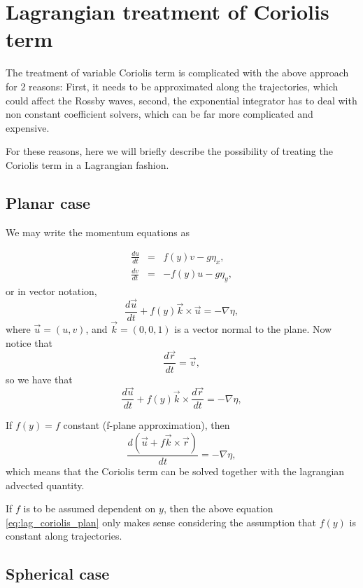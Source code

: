 \documentclass[10pt,a4paper]{article}
\begin{document}
\section{Lagrangian treatment of Coriolis term}

The treatment of variable Coriolis term is complicated with the above approach for 2 reasons: First, it needs to be approximated along the trajectories, which could affect the Rossby waves, second, the exponential integrator has to deal with non constant coefficient solvers, which can be far more complicated and expensive.

For these reasons, here we will briefly describe the possibility of treating the Coriolis term in a Lagrangian fashion.

\subsection{Planar case}
We may write the momentum equations as

\begin{eqnarray}
\frac{du}{dt}&=&  f(y)v -g\eta_x,\\
\frac{dv}{dt} &=& -f(y)u- g\eta_y, 
\end{eqnarray}
or in vector notation,
\begin{equation}
\frac{d\vec{u}}{dt}+f(y)\vec{k}\times\vec{u}=-\nabla \eta, 
\end{equation}
where $\vec{u}=(u,v)$, and $\vec{k}=(0,0,1)$ is a vector normal to the plane. Now notice that 
\begin{equation}
\frac{d \vec{r}}{dt} = \vec{v},
\end{equation}
so we have that
\begin{equation}
\frac{d\vec{u}}{dt}+f(y)\vec{k}\times\frac{d \vec{r}}{dt}=-\nabla \eta, 
\end{equation}

If $f(y)=f$ constant (f-plane approximation), then
\begin{equation}
\frac{d\left( \vec{u} + f\vec{k}\times \vec{r}\right)}{dt}=-\nabla \eta, 
\label{eq:lag_coriolis_plan}
\end{equation}
which means that the Coriolis term can be solved together with the lagrangian advected quantity. 

If $f$ is to be assumed dependent on $y$, then the above equation \eqref{eq:lag_coriolis_plan} only makes sense considering the assumption that $f(y)$ is constant along trajectories. 

\subsection{Spherical case}
\end{document}
